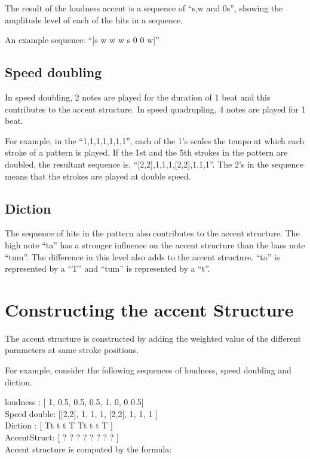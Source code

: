 The result of the loudness accent is a sequence of ``s,w and 0s'', showing the amplitude level of each of the hits in a sequence. 

An example sequence: ``[s w w w s 0 0 w]''

\subsection{Speed doubling}

In speed doubling, 2 notes are played for the duration of 1 beat and this contributes to the accent structure. In speed quadrupling, 4 notes are played for 1 beat.

For example, in the ``1,1,1,1,1,1,1'', each of the 1's scales the tempo at which each stroke of a pattern is played. 
If the 1st and the 5th strokes in the pattern are doubled, the resultant sequence is, ``[2,2],1,1,1,[2,2],1,1,1''. The 2's in the sequence means that the strokes are played at double speed.

\subsection{Diction}

The sequence of hits in the pattern also contributes to the accent structure. The high note ``ta'' has a stronger influence on the accent structure than the bass note ``tum''. The difference in this level also adds to the accent structure. ``ta'' is represented by a ``T'' and ``tum'' is represented by a ``t''.

\section{Constructing the accent Structure}

The accent structure is constructed by adding the weighted value of the different parameters at same stroke positions.

For example, consider the following sequences of loudness, speed doubling and diction.

loudness    : [  1,  0.5, 0.5, 0.5,  1,   0, 0 0.5] \\
Speed double: [[2,2], 1,   1,   1, [2,2], 1, 1, 1 ] \\
Diction     : [  Tt   t    t    T    Tt   t  t  T ] \\
AccentStruct: [  ?    ?    ?    ?    ?    ?  ?  ? ]  \\

Accent structure is computed by the formula:

